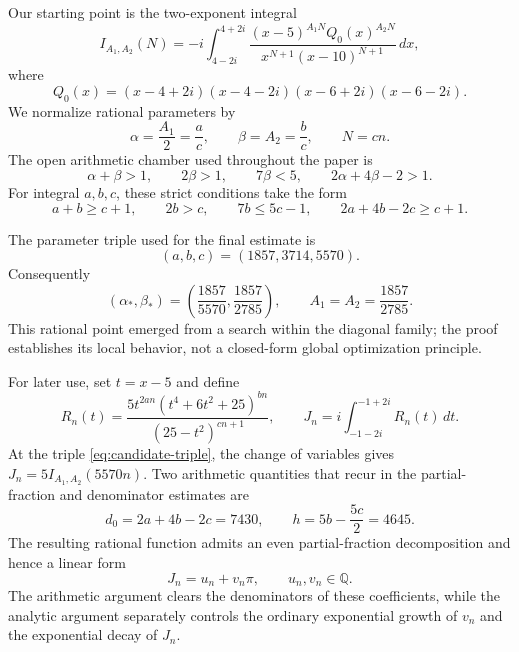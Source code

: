 \documentclass[11pt,reqno,letterpaper]{amsart}
\numberwithin{equation}{section}
\theoremstyle{definition}
\theoremstyle{remark}
\begin{document}
Our starting point is the two-exponent integral
\begin{equation}\label{eq:original-integral}
 I_{A_1,A_2}(N)
 =-i\int_{4-2i}^{4+2i}
 \frac{(x-5)^{A_1N}Q_0(x)^{A_2N}}
 {x^{N+1}(x-10)^{N+1}}\,dx,
\end{equation}
where
\begin{equation}\label{eq:q-zero}
 Q_0(x)=(x-4+2i)(x-4-2i)(x-6+2i)(x-6-2i).
\end{equation}
We normalize rational parameters by
\begin{equation}\label{eq:parameter-normalization}
 \alpha=\frac{A_1}{2}=\frac ac,
 \qquad
 \beta=A_2=\frac bc,
 \qquad
 N=cn.
\end{equation}
The open arithmetic chamber used throughout the paper is
\begin{equation}\label{eq:admissible-chamber}
 \alpha+\beta>1,
 \qquad 2\beta>1,
 \qquad 7\beta<5,
 \qquad 2\alpha+4\beta-2>1.
\end{equation}
For integral $a,b,c$, these strict conditions take the form
\begin{equation}\label{eq:integer-chamber}
 a+b\geq c+1,
 \qquad 2b>c,
 \qquad 7b\leq 5c-1,
 \qquad 2a+4b-2c\geq c+1.
\end{equation}

The parameter triple used for the final estimate is
\begin{equation}\label{eq:candidate-triple}
 (a,b,c)=(1857,3714,5570).
\end{equation}
Consequently
\begin{equation}\label{eq:candidate-parameters}
 (\alpha_*,\beta_*)
 =\left(\frac{1857}{5570},\frac{1857}{2785}\right),
 \qquad
 A_1=A_2=\frac{1857}{2785}.
\end{equation}
This rational point emerged from a search within the diagonal family; the
proof establishes its local behavior, not a closed-form global
optimization principle.

For later use, set $t=x-5$ and define
\begin{equation}\label{eq:rational-function}
 R_n(t)=
 \frac{5t^{2an}(t^4+6t^2+25)^{bn}}
 {(25-t^2)^{cn+1}},
 \qquad
 J_n=i\int_{-1-2i}^{-1+2i}R_n(t)\,dt.
\end{equation}
At the triple \eqref{eq:candidate-triple}, the change of variables gives
$J_n=5I_{A_1,A_2}(5570n)$.  Two arithmetic quantities that recur in the
partial-fraction and denominator estimates are
\begin{equation}\label{eq:d0-h}
 d_0=2a+4b-2c=7430,
 \qquad
 h=5b-\frac{5c}{2}=4645.
\end{equation}
The resulting rational function admits an even partial-fraction
decomposition and hence a linear form
\begin{equation}\label{eq:linear-form-preview}
 J_n=u_n+v_n\pi,
 \qquad u_n,v_n\in\mathbb Q.
\end{equation}
The arithmetic argument clears the denominators of these coefficients,
while the analytic argument separately controls the ordinary exponential
growth of $v_n$ and the exponential decay of $J_n$.
\end{document}
